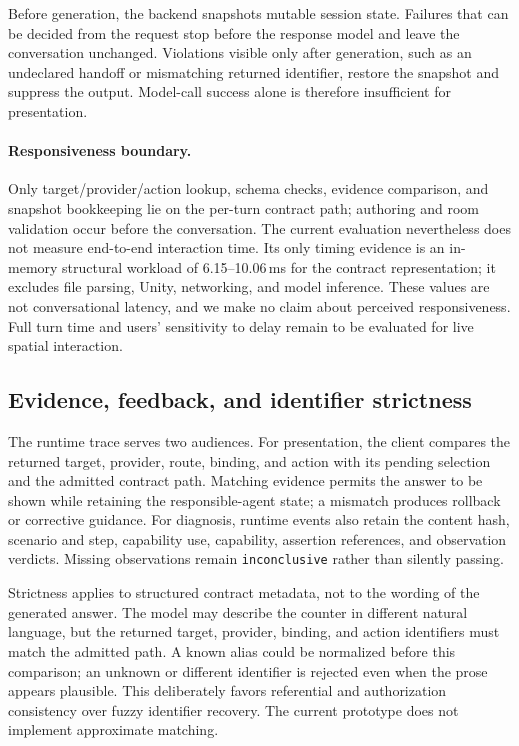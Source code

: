 Before generation, the backend snapshots mutable session state.  Failures that
can be decided from the request stop before the response model and leave the
conversation unchanged.  Violations visible only after generation, such as an
undeclared handoff or mismatching returned identifier, restore the snapshot and
suppress the output.  Model-call success alone is therefore insufficient for
presentation.

\paragraph{Responsiveness boundary.}
Only target/provider/action lookup, schema checks, evidence comparison, and
snapshot bookkeeping lie on the per-turn contract path; authoring and room
validation occur before the conversation.  The current evaluation nevertheless
does not measure end-to-end interaction time.  Its only timing evidence is an
in-memory structural workload of 6.15--10.06\,ms for the contract
representation; it excludes file parsing, Unity, networking, and model
inference.  These values are not conversational latency, and we make no claim
about perceived responsiveness.  Full turn time and users' sensitivity to
delay remain to be evaluated for live spatial interaction.

\subsection{Evidence, feedback, and identifier strictness}

The runtime trace serves two audiences.  For presentation, the client compares
the returned target, provider, route, binding, and action with its pending
selection and the admitted contract path.  Matching evidence permits the
answer to be shown while retaining the responsible-agent state; a mismatch
produces rollback or corrective guidance.  For diagnosis, runtime events also
retain the content hash, scenario and step, capability use, capability,
assertion references, and observation verdicts.  Missing observations remain
\texttt{inconclusive} rather than silently passing.

Strictness applies to structured contract metadata, not to the wording of the
generated answer.  The model may describe the counter in different natural
language, but the returned target, provider, binding, and action identifiers
must match the admitted path.  A known alias could be normalized before this
comparison; an unknown or different identifier is rejected even when the prose
appears plausible.  This deliberately favors referential and authorization
consistency over fuzzy identifier recovery.  The current prototype does not
implement approximate matching.


